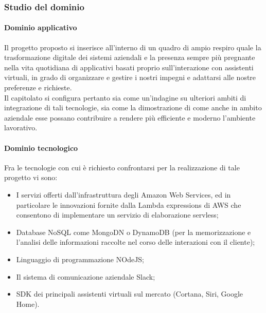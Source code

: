 		\subsubsection{Studio del dominio}
			\paragraph{Dominio applicativo}
			Il progetto proposto si inserisce all'interno di un quadro di ampio respiro quale la trasformazione digitale dei sistemi aziendali e la 
			presenza sempre più pregnante nella vita quotidiana di applicativi basati proprio sull'interazione con assistenti virtuali, in grado di 
			organizzare e gestire i nostri impegni e adattarsi alle nostre preferenze e richieste.\\
			Il capitolato si configura pertanto sia come un'indagine su ulteriori ambiti di integrazione di tali tecnologie, sia come la dimostrazione 
			di come anche in ambito aziendale esse possano contribuire a rendere più efficiente e moderno l'ambiente lavorativo.
			\paragraph{Dominio tecnologico}
			Fra le tecnologie con cui è richiesto confrontarsi per la realizzazione di tale progetto vi sono:
			\begin{itemize}
				\item I servizi offerti dall'infrastruttura degli Amazon Web Services, ed in particolare le innovazioni fornite dalla Lambda expressions 
				di AWS che consentono di implementare un servizio di elaborazione servless;
				\item Database NoSQL come MongoDN o DynamoDB (per la memorizzazione e l'analisi delle informazioni raccolte nel corso delle interazioni con il cliente);
				\item Linguaggio di programmazione NOdeJS;
				\item Il sistema di comunicazione aziendale Slack;
				\item SDK dei principali assistenti virtuali sul mercato (Cortana, Siri, Google Home).
			\end{itemize}
